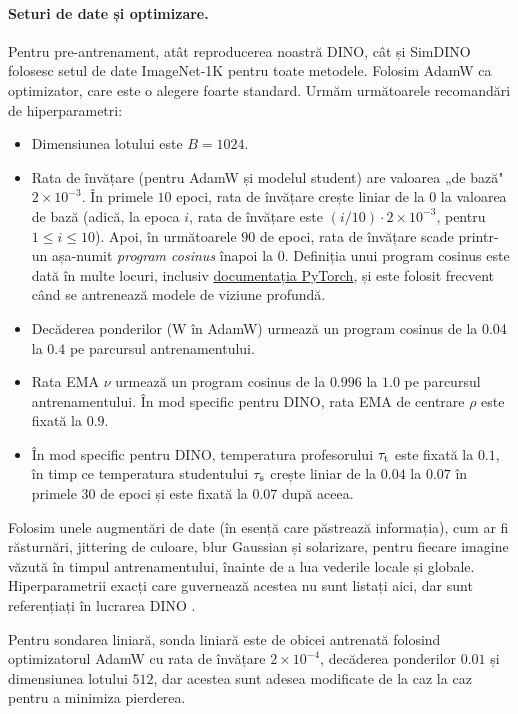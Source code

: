 \documentclass[../../book-main_ro.tex]{subfiles}
\begin{document}
\paragraph{Seturi de date și optimizare.} Pentru pre-antrenament, atât reproducerea noastră DINO, cât și SimDINO folosesc setul de date ImageNet-1K pentru toate metodele. Folosim AdamW \citep{Loshchilov2017DecoupledWD} ca optimizator, care este o alegere foarte standard. Urmăm următoarele recomandări de hiperparametri:
\begin{itemize}
    \item Dimensiunea lotului este \(B = 1024\).
    \item Rata de învățare (pentru AdamW și modelul student) are valoarea „de bază" \(2 \times 10^{-3}\). În primele \(10\) epoci, rata de învățare crește liniar de la \(0\) la valoarea de bază (adică, la epoca \(i\), rata de învățare este \((i/10) \cdot 2 \times 10^{-3}\), pentru \(1 \leq i \leq 10\)). Apoi, în următoarele \(90\) de epoci, rata de învățare scade printr-un așa-numit \textit{program cosinus} înapoi la \(0\). Definiția unui program cosinus este dată în multe locuri, inclusiv \href{https://pytorch.org/docs/stable/generated/torch.optim.lr_scheduler.CosineAnnealingLR.html}{documentația PyTorch}, și este folosit frecvent când se antrenează modele de viziune profundă.
    \item Decăderea ponderilor (W în AdamW) urmează un program cosinus de la 0.04 la \(0.4\) pe parcursul antrenamentului.
    \item Rata EMA \(\nu\) urmează un program cosinus de la \(0.996\) la \(1.0\) pe parcursul antrenamentului. În mod specific pentru DINO, rata EMA de centrare \(\rho\) este fixată la \(0.9\).
    \item În mod specific pentru DINO, temperatura profesorului \(\tau_{\mathrm{t}}\) este fixată la \(0.1\), în timp ce temperatura studentului \(\tau_{\mathrm{s}}\) crește liniar de la \(0.04\) la \(0.07\) în primele \(30\) de epoci și este fixată la \(0.07\) după aceea.
\end{itemize}
Folosim unele augmentări de date (în esență care păstrează informația), cum ar fi răsturnări, jittering de culoare, blur Gaussian și solarizare, pentru fiecare imagine văzută în timpul antrenamentului, înainte de a lua vederile locale și globale. Hiperparametrii exacți care guvernează acestea nu sunt listați aici, dar sunt referențiați în lucrarea DINO \citep{caron2021emerging}.

Pentru sondarea liniară, sonda liniară este de obicei antrenată folosind optimizatorul AdamW cu rata de învățare \(2 \times 10^{-4}\), decăderea ponderilor \(0.01\) și dimensiunea lotului \(512\), dar acestea sunt adesea modificate de la caz la caz pentru a minimiza pierderea.
\end{document}
